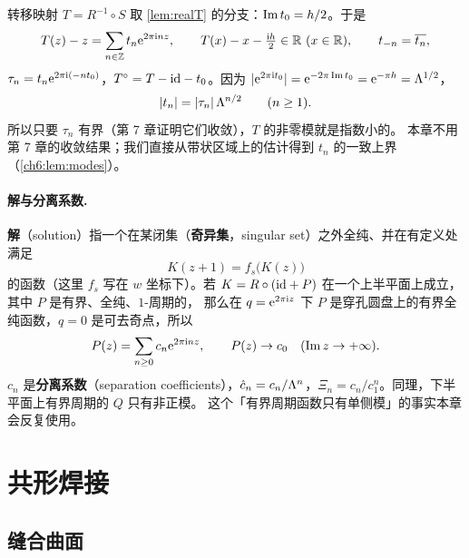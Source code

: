 转移映射 $T=R^{-1}\circ S$ 取 \cref{lem:realT} 的分支：$\operatorname{Im} t_0=h/2$。于是
\begin{equation}\label{ch6:eq:Treal}
 T(z)-z=\sum_{n\in\Z}t_n\etwopi{nz},\qquad T(x)-x-\tfrac{\ii h}2\in\R\ (x\in\R),\qquad t_{-n}=\overline{t_n},
\end{equation}
$\tau_n=t_n\mathrm{e}^{2\pi\mathrm{i} (-nt_0)}$，$T^{\circ}=T-\mathrm{id}-t_0$。因为 $|\mathrm{e}^{2\pi\mathrm{i} t_0}|=\mathrm{e}^{-2\pi\operatorname{Im} t_0}=\mathrm{e}^{-\pi h}=\Lambda^{1/2}$，
\begin{equation}\label{ch6:eq:tn-size}
 |t_n|=|\tau_n|\,\Lambda^{n/2}\qquad(n\ge1).
\end{equation}
所以只要 $\tau_n$ 有界（第 7 章证明它们收敛），$T$ 的非零模就是指数小的。
本章不用第 7 章的收敛结果；我们直接从带状区域上的估计得到 $t_n$ 的一致上界（\cref{ch6:lem:modes}）。

\paragraph{解与分离系数.}
\textbf{解}（solution）指一个在某闭集（\textbf{奇异集}，singular set）之外全纯、并在有定义处满足
\begin{equation}\label{ch6:eq:abel}
 K(z+1)=f_s\bigl(K(z)\bigr)
\end{equation}
的函数（这里 $f_s$ 写在 $w$ 坐标下）。若 $K=R\circ(\mathrm{id}+P)$ 在一个上半平面上成立，其中 $P$ 是有界、全纯、$1$-周期的，
那么在 $q=\mathrm{e}^{2\pi\mathrm{i} z}$ 下 $P$ 是穿孔圆盘上的有界全纯函数，$q=0$ 是可去奇点，所以
\begin{equation}\label{ch6:eq:P-expansion}
 P(z)=\sum_{n\ge0}c_n\mathrm{e}^{2\pi\mathrm{i} nz},\qquad P(z)\to c_0\quad(\operatorname{Im} z\to+\infty).
\end{equation}
$c_n$ 是\textbf{分离系数}（separation coefficients），$\hat c_n=c_n/\Lambda^n$，$\Xi_n=c_n/c_1^n$。同理，下半平面上有界周期的 $Q$ 只有非正模。
这个「有界周期函数只有单侧模」的事实本章会反复使用。

\section{共形焊接}\label{ch6:sec:weld}

\subsection{缝合曲面}

